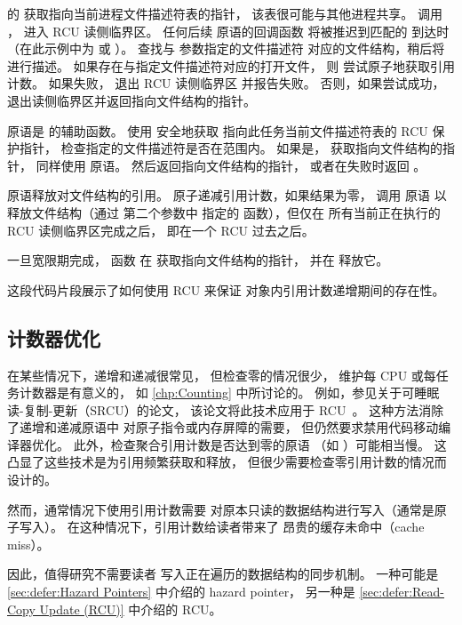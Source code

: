 \begin{fcvref}
 的  获取指向当前进程文件描述符表的指针，
该表很可能与其他进程共享。
 调用 ，
进入 RCU 读侧临界区。
任何后续  原语的回调函数
将被推迟到匹配的  到达时
（在此示例中为  或 ）。
 查找与  参数指定的文件描述符
对应的文件结构，稍后将进行描述。
如果存在与指定文件描述符对应的打开文件，
则  尝试原子地获取引用计数。
如果失败， 退出 RCU 读侧临界区
并报告失败。
否则，如果尝试成功，
退出读侧临界区并返回指向文件结构的指针。

 原语是  的辅助函数。
 使用  安全地获取
指向此任务当前文件描述符表的 RCU 保护指针，
 检查指定的文件描述符是否在范围内。
如果是， 获取指向文件结构的指针，
同样使用  原语。
 然后返回指向文件结构的指针，
或者在失败时返回 。

 原语释放对文件结构的引用。
 原子递减引用计数，如果结果为零，
 调用  原语
以释放文件结构（通过  第二个参数中
指定的  函数），但仅在
所有当前正在执行的 RCU 读侧临界区完成之后，
即在一个 RCU  过去之后。

一旦宽限期完成， 函数
在  获取指向文件结构的指针，
并在  释放它。
\end{fcvref}

这段代码片段展示了如何使用 RCU 来保证
对象内引用计数递增期间的存在性。

\subsection{计数器优化}
\label{sec:together:Counter Optimizations}

在某些情况下，递增和递减很常见，
但检查零的情况很少，
维护每 CPU 或每任务计数器是有意义的，
如 \cref{chp:Counting} 中所讨论的。
例如，参见关于可睡眠读-复制-更新（SRCU）的论文，
该论文将此技术应用于 RCU~\cite{PaulEMcKenney2006c}。
这种方法消除了递增和递减原语中
对原子指令或内存屏障的需要，
但仍然要求禁用代码移动编译器优化。
此外，检查聚合引用计数是否达到零的原语
（如 ）可能相当慢。
这凸显了这些技术是为引用频繁获取和释放，
但很少需要检查零引用计数的情况而设计的。

然而，通常情况下使用引用计数需要
对原本只读的数据结构进行写入（通常是原子写入）。
在这种情况下，引用计数给读者带来了
昂贵的缓存未命中（cache miss）。

因此，值得研究不需要读者
写入正在遍历的数据结构的同步机制。
一种可能是 \cref{sec:defer:Hazard Pointers}
中介绍的 hazard pointer，
另一种是 \cref{sec:defer:Read-Copy Update (RCU)}
中介绍的 RCU。
